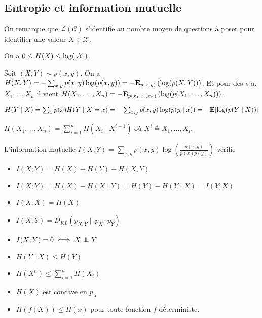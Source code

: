 \subsection{Entropie et information mutuelle}

	On remarque que $\mathcal{L}(\mathcal{C})$ s'identifie au nombre moyen de questions à poser pour identifier une valeur $X \in \mathcal{X}$.

	\begin{thm}
		On a $0 \leq H(X) \leq \log( \left\lvert\mathcal{X}\right\rvert )$.
	\end{thm}

	\begin{defn}
		Soit $(X,Y) \sim p(x,y)$.
		On a $H(X,Y) = - \sum_{x,y} p(x,y) \log(p(x,y)) = - \mathbf{E}_{p(x,y)} \left( \log (p(X,Y)) \right)$.
		Et pour des v.a. $X_1, \ldots, X_n$ il vient $H(X_1,\ldots,X_n) = - \mathbf{E}_{p(x_1,\ldots,x_n)} \left( \log( p(X_1,\ldots,X_n)) \right)$.
	\end{defn}

	\begin{defn}
		$H(Y \mid X)
			= \sum_x p(x) H(Y \mid X = x)
			= - \sum_{x,y} p(x,y) \log(p(y \mid x))
			= - \mathbf{E} [ \log(p(Y \mid X)) ]$
	\end{defn}

	\begin{thm}
		$H(X_1,\ldots,X_n) = \sum_{i = 1}^n H(X_i \mid X^{i - 1})$ où $X^i \triangleq X_1,\ldots,X_i$.
	\end{thm}

	\begin{pop}
		L'information mutuelle $I(X;Y) = \sum_{x,y} p(x,y) \log \left( \frac{p(x,y)}{p(x)p(y)} \right)$ vérifie
		\begin{itemize}
			\item[\textbullet] $I(X;Y) = H(X) + H(Y) - H(X,Y)$
			\item[\textbullet] $I(X;Y) = H(X) - H(X \mid Y) = H(Y) - H(Y \mid X) = I(Y;X)$
			\item[\textbullet] $I(X;X) = H(X)$
			\item[\textbullet] $I(X;Y) = D_{KL}( p_{X,Y} \| p_X \cdot p_Y )$
			\item[\textbullet] $I(X;Y) = 0 \iff X \indep Y$
			\item[\textbullet] $H(Y \mid X) \leq H(Y)$
			\item[\textbullet] $H(X^n) \leq \sum_{i = 1}^n H(X_i)$
			\item[\textbullet] $H(X)$ est concave en $p_X$
			\item[\textbullet] $H(f(X)) \leq H(x)$ pour toute fonction $f$ déterministe.
		\end{itemize}
	\end{pop}

